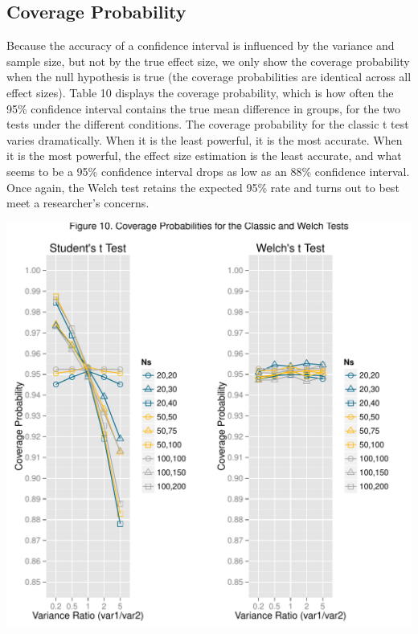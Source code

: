 \documentclass[man,a4paper,noextraspace]{apa6}\usepackage[]{graphicx}\usepackage[]{color}
\makeatletter
\def\maxwidth{ %
  \ifdim\Gin@nat@width>\linewidth
    \linewidth
  \else
    \Gin@nat@width
  \fi
}
\newenvironment{knitrout}{}{} %
\makeatother
\begin{document}
\subsection{Coverage Probability}
Because the accuracy of a confidence interval is influenced by the variance and sample size, but not by the true effect size, we only show the coverage probability when the null hypothesis is true (the coverage probabilities are identical across all effect sizes). Table 10 displays the coverage probability, which is how often the 95\% confidence interval contains the true mean difference in groups, for the two tests under the different conditions. The coverage probability for the classic t test varies dramatically. When it is the least powerful, it is the most accurate. When it is the most powerful, the effect size estimation is the least accurate, and what seems to be a 95\% confidence interval drops as low as an 88\% confidence interval. Once again, the Welch test retains the expected 95\% rate and turns out to best meet a researcher's concerns. 






\begin{knitrout}
\color{fgcolor}
\includegraphics[width=\maxwidth]{figure/coverage_plots} 

\end{knitrout}
\end{document}
